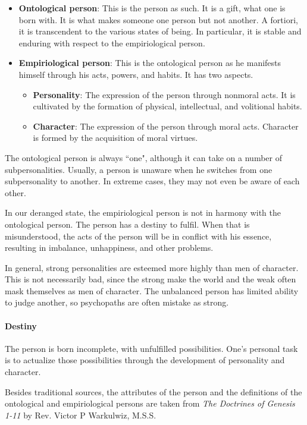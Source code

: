 \begin{itemize}
\item \textbf{Ontological person}: This is the person as such. It is a gift, what one is born with. It is what makes someone one person but not another. A fortiori, it is transcendent to the various states of being. In particular, it is stable and enduring with respect to the empiriological person. 
\item \textbf{Empiriological person}: This is the ontological person as he manifests himself through his acts, powers, and habits. It has two aspects. 

\begin{itemize}
\item \textbf{Personality}: The expression of the person through nonmoral acts. It is cultivated by the formation of physical, intellectual, and volitional habits. 
\item \textbf{Character}: The expression of the person through moral acts. Character is formed by the acquisition of moral virtues. 
\end{itemize}
\end{itemize}
The ontological person is always ``one", although it can take on a number of subpersonalities. Usually, a person is unaware when he switches from one subpersonality to another. In extreme cases, they may not even be aware of each other.

In our deranged state, the empiriological person is not in harmony with the ontological person. The person has a destiny to fulfil. When that is misunderstood, the acts of the person will be in conflict with his essence, resulting in imbalance, unhappiness, and other problems.

In general, strong personalities are esteemed more highly than men of character. This is not necessarily bad, since the strong make the world and the weak often mask themselves as men of character. The unbalanced person has limited ability to judge another, so psychopaths are often mistake as strong.

\paragraph{Destiny}
The person is born incomplete, with unfulfilled possibilities. One's personal task is to actualize those possibilities through the development of personality and character.

Besides traditional sources, the attributes of the person and the definitions of the ontological and empiriological persons are taken from \textit{The Doctrines of Genesis 1-11} by Rev. Victor P Warkulwiz, M.S.S.

